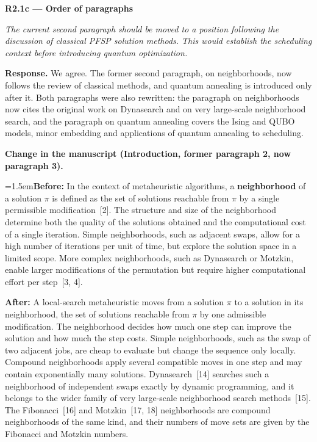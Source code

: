 \documentclass[12pt]{article}
\newenvironment{rc}[1]{\par\medskip\noindent\textbf{#1}\par\nopagebreak\noindent\itshape\renewcommand{\emph}[1]{\textbf{##1}}\ignorespaces}{\par}
\newcommand{\answer}[1]{\par\smallskip\noindent\textbf{Response.} #1\par}
\newcommand{\change}[3]{\par\smallskip\noindent\textbf{Change in the manuscript (#1).}\par
  {\leftskip=1.5em\noindent\textbf{Before:} #2\par\noindent\textbf{After:} #3\par}}
\begin{document}
\begin{rc}{R2.1c --- Order of paragraphs}
The current second paragraph should be moved to a position following the discussion of classical PFSP solution methods. This would establish the scheduling context before introducing quantum optimization.
\end{rc}
\answer{We agree. The former second paragraph, on neighborhoods, now follows the review of classical methods, and quantum annealing is introduced only after it. Both paragraphs were also rewritten: the paragraph on neighborhoods now cites the original work on Dynasearch and on very large-scale neighborhood search, and the paragraph on quantum annealing covers the Ising and QUBO models, minor embedding and applications of quantum annealing to scheduling.}
\change{Introduction, former paragraph 2, now paragraph 3}{In the context of metaheuristic algorithms, a \emph{neighborhood} of a solution $\pi$ is defined as the set of solutions reachable from $\pi$ by a single permissible modification~[2]. The structure and size of the neighborhood determine both the quality of the solutions obtained and the computational cost of a single iteration. Simple neighborhoods, such as adjacent swaps, allow for a high number of iterations per unit of time, but explore the solution space in a limited scope. More complex neighborhoods, such as Dynasearch or Motzkin, enable larger modifications of the permutation but require higher computational effort per step~[3, 4].}{A local-search metaheuristic moves from a solution $\pi$ to a solution in its neighborhood, the set of solutions reachable from $\pi$ by one admissible modification. The neighborhood decides how much one step can improve the solution and how much the step costs. Simple neighborhoods, such as the swap of two adjacent jobs, are cheap to evaluate but change the sequence only locally. Compound neighborhoods apply several compatible moves in one step and may contain exponentially many solutions. Dynasearch~[14] searches such a neighborhood of independent swaps exactly by dynamic programming, and it belongs to the wider family of very large-scale neighborhood search methods~[15]. The Fibonacci~[16] and Motzkin~[17, 18] neighborhoods are compound neighborhoods of the same kind, and their numbers of move sets are given by the Fibonacci and Motzkin numbers.}
\end{document}
